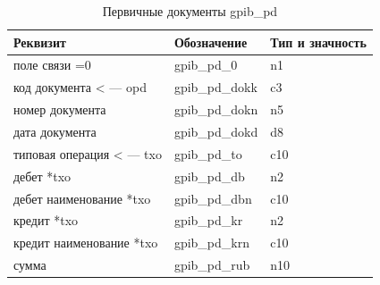 \begin{table}[!htbp]
    \centering
    \scriptsize
    \caption{Первичные документы gpib\_pd}
    \begin{tabular}{|l|l|l|} 

                                                                                   \hline
\textbf{Реквизит}           &\textbf{Обозначение}   &\textbf{Тип и значность}   \\ \hline
поле связи =0               &gpib\_pd\_0            &n1                         \\ \hline
код документа < --- opd     &gpib\_pd\_dokk         &c3                         \\ \hline
номер документа             &gpib\_pd\_dokn         &n5                         \\ \hline
дата документа              &gpib\_pd\_dokd         &d8                         \\ \hline
типовая операция < --- txo  &gpib\_pd\_to           &c10                        \\ \hline
дебет *txo                  &gpib\_pd\_db           &n2                         \\ \hline
дебет наименование *txo     &gpib\_pd\_dbn          &c10                        \\ \hline
кредит *txo                 &gpib\_pd\_kr           &n2                         \\ \hline
кредит наименование *txo    &gpib\_pd\_krn          &c10                        \\ \hline
сумма                       &gpib\_pd\_rub          &n10                        \\ \hline

    \end{tabular}
\end{table}



